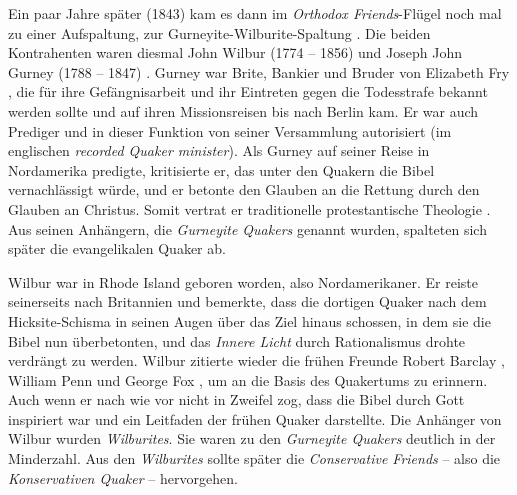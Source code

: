 Ein paar Jahre später (1843) kam es dann im \textit{Orthodox Friends}-Flügel
noch mal zu einer Aufspaltung, zur Gurneyite-Wilburite-Spaltung
. Die beiden
Kontrahenten waren diesmal John Wilbur (1774 -- 1856)  und Joseph John Gurney
(1788 -- 1847) . Gurney war Brite, Bankier
 und Bruder von Elizabeth Fry , die für
ihre Gefängnisarbeit  und ihr Eintreten gegen
die Todesstrafe  bekannt werden
sollte und auf ihren Missionsreisen bis nach Berlin kam.
Er war auch Prediger  und in dieser Funktion
von seiner
Versammlung autorisiert (im englischen \textit{recorded Quaker minister}). Als
Gurney auf seiner Reise in Nordamerika predigte, kritisierte er, das unter den
Quakern die Bibel  vernachlässigt würde, und er betonte den Glauben
an die
Rettung durch den Glauben an Christus. Somit vertrat er traditionelle
protestantische Theologie . Aus seinen
Anhängern, die \textit{Gurneyite Quakers}
genannt wurden, spalteten sich später die evangelikalen Quaker
 ab.

\medskip

Wilbur war in Rhode Island  geboren worden, also
Nordamerikaner. Er reiste seinerseits
nach Britannien und bemerkte, dass die dortigen Quaker nach dem Hicksite-Schisma
in seinen Augen über das Ziel hinaus schossen, in dem sie die Bibel nun
überbetonten, und das \textit{Innere Licht} durch Rationalismus drohte verdrängt
zu werden. Wilbur zitierte wieder die frühen Freunde Robert Barclay
, William
Penn  und George Fox , um an die Basis des Quakertums zu erinnern. Auch wenn er
nach wie vor nicht in Zweifel zog, dass die Bibel durch Gott inspiriert war und
ein Leitfaden der frühen Quaker darstellte. Die Anhänger von Wilbur wurden
\textit{Wilburites}. Sie waren zu den
\textit{Gurneyite Quakers} deutlich in der Minderzahl. 
Aus den \textit{Wilburites} sollte später die
\textit{Conservative Friends}  -- also die
\textit{Konservativen Quaker} --
hervorgehen.

\medskip

